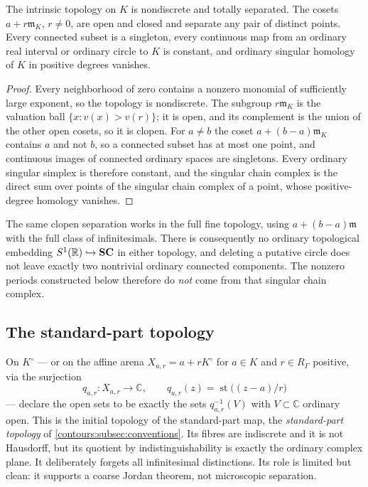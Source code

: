 \documentclass[11pt,letterpaper]{article}
\theoremstyle{definition}
\theoremstyle{remark}
\newcommand{\R}{\mathbb R}\newcommand{\C}{\mathbb C}\newcommand{\Q}{\mathbb Q}
\newcommand{\m}{\mathfrak m}\newcommand{\st}{\operatorname{st}}
\numberwithin{equation}{section}
\begin{document}
\begin{proposition}\label{contours:prop:intrinsic}
The intrinsic topology on $K$ is nondiscrete and totally separated. The cosets
$a+r\m_K$, $r\ne0$, are open and closed and separate any pair of distinct points.
Every connected subset is a singleton, every continuous map from an ordinary real
interval or ordinary circle to $K$ is constant, and ordinary singular homology of
$K$ in positive degrees vanishes.
\end{proposition}
\begin{proof}
Every neighborhood of zero contains a nonzero monomial of sufficiently large
exponent, so the topology is nondiscrete. The subgroup $r\m_K$ is the valuation
ball $\{x:v(x)>v(r)\}$; it is open, and its complement is the union of the other
open cosets, so it is clopen. For $a\ne b$ the coset $a+(b-a)\m_K$ contains $a$
and not $b$, so a connected subset has at most one point, and continuous images of
connected ordinary spaces are singletons. Every ordinary singular simplex is
therefore constant, and the singular chain complex is the direct sum over points of
the singular chain complex of a point, whose positive-degree homology vanishes.
\end{proof}

The same clopen separation works in the full fine topology, using $a+(b-a)\m$ with
the full class of infinitesimals. There is consequently no ordinary topological
embedding $S^1(\R)\hookrightarrow\SC$ in either topology, and deleting a putative
circle does not leave exactly two nontrivial ordinary connected components. The
nonzero periods constructed below therefore do \emph{not} come from that singular
chain complex.

\subsection{The standard-part topology}
On $K^\circ$ --- or on the affine arena $X_{a,r}=a+rK^\circ$ for $a\in K$ and
$r\in R_\Gamma$ positive, via the surjection
\begin{equation}\label{contours:eq:quotientmap}
  q_{a,r}:X_{a,r}\longrightarrow\C,\qquad
  q_{a,r}(z)=\st\bigl((z-a)/r\bigr)
\end{equation}
--- declare the open sets to be exactly the sets $q_{a,r}^{-1}(V)$ with
$V\subset\C$ ordinary open. This is the initial topology of the standard-part map,
the \emph{standard-part topology} of \cref{contours:subsec:conventions}. Its fibres
are indiscrete and it is not Hausdorff, but its quotient by indistinguishability is
exactly the ordinary complex plane. It deliberately forgets all infinitesimal
distinctions. Its role is limited but clean: it supports a coarse Jordan theorem,
not microscopic separation.
\end{document}
